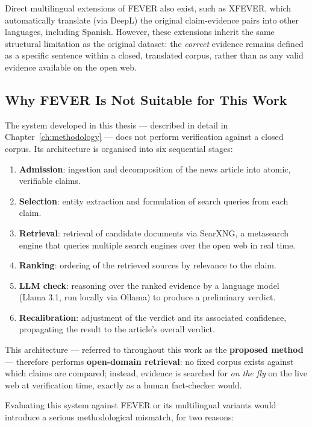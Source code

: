 Direct multilingual extensions of FEVER also exist, such as XFEVER,
which automatically translate (via DeepL) the original claim-evidence
pairs into other languages, including Spanish. However, these
extensions inherit the same structural limitation as the original
dataset: the \textit{correct} evidence remains defined as a specific
sentence within a closed, translated corpus, rather than as any
valid evidence available on the open web.

\subsection{Why FEVER Is Not Suitable for This Work}
\label{subsec:discard-justification}

The system developed in this thesis --- described in detail in
Chapter~\ref{ch:methodology} --- does not perform verification
against a closed corpus. Its architecture is organised into six
sequential stages:

\begin{enumerate}
    \item \textbf{Admission}: ingestion and decomposition of the
    news article into atomic, verifiable claims.
    \item \textbf{Selection}: entity extraction and formulation of
    search queries from each claim.
    \item \textbf{Retrieval}: retrieval of candidate documents via
    SearXNG, a metasearch engine that queries multiple search
    engines over the open web in real time.
    \item \textbf{Ranking}: ordering of the retrieved sources by
    relevance to the claim.
    \item \textbf{LLM check}: reasoning over the ranked evidence by a
    language model (Llama 3.1, run locally via Ollama) to produce a
    preliminary verdict.
    \item \textbf{Recalibration}: adjustment of the verdict and its
    associated confidence, propagating the result to the article's
    overall verdict.
\end{enumerate}

This architecture --- referred to throughout this work as the
\textbf{proposed method} --- therefore performs
\textbf{open-domain retrieval}: no fixed corpus exists against which
claims are compared; instead, evidence is searched for \textit{on
the fly} on the live web at verification time, exactly as a human
fact-checker would.

Evaluating this system against FEVER or its multilingual variants
would introduce a serious methodological mismatch, for two reasons:


